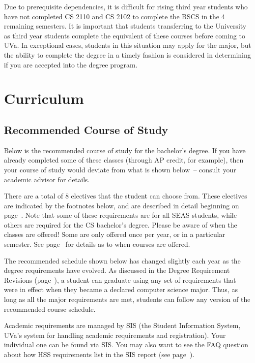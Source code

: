 \documentclass[10pt,letter]{book}
\newcommand{\mysection}[1]{\section{#1}\renewcommand{\rightmark}{#1}}
\newcommand{\myurl}[1]{\footnote{\scriptsize\url{#1}}}
\begin{document}
Due to prerequisite dependencies, it is difficult for rising third year
students who have not completed CS 2110 and CS 2102 to complete the
BSCS in the 4 remaining semesters. It is important that students
transferring to the University as third year students complete the equivalent
of these courses before coming to UVa. In exceptional cases, students
in this situation may apply for the major, but the ability to complete
the degree in a timely fashion is considered in determining if
you are accepted into the degree program.


\mysection{Curriculum}

\subsection{Recommended Course of Study}

Below is the recommended course of study for the bachelor's degree. If
you have already completed some of these classes (through AP credit,
for example), then your course of study would deviate from what is
shown below~-- consult your academic advisor for details.

There are a total of 8 electives that the student can choose
from. These electives are indicated by the footnotes below, and are
described in detail beginning on page~\pageref{sec:electiveinfo}. Note
that some of these requirements are for all SEAS students, while
others are required for the CS bachelor's degree. Please be aware of
when the classes are offered! Some are only offered once per year, or
in a particular semester. See page~\pageref{sec:coursedesc} for details
as to when courses are offered.

The recommended schedule shown below has changed slightly each year as
the degree requirements have evolved. As discussed in the Degree
Requirement Revisions (page~\pageref{sec:degreerevisions}), a student
can graduate using any set of requirements that were in effect when
they became a declared computer science major. Thus, as long as all
the major requirements are met, students can follow any version of the
recommended course schedule.

Academic requirements are managed by SIS (the Student Information
System, UVa's system for handling academic requirements and
registration).
Your individual one can be found via SIS.  You may also want to see
the FAQ question about how HSS requirements list in the SIS report
(see page~\pageref{sec:sishssissue}).
\end{document}
